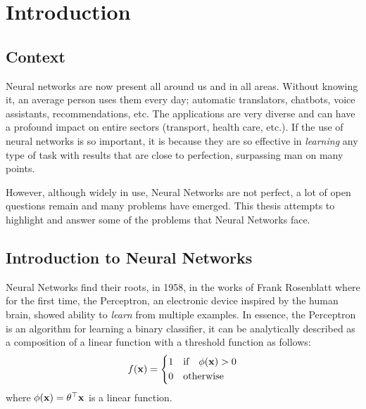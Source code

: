 \chapter{Introduction}
\label{chapter:introduction}
\localtableofcontents

\section{Context}

Neural networks are now present all around us and in all areas.
Without knowing it, an average person uses them every day; automatic translators, chatbots, voice assistants, recommendations, etc.
The applications are very diverse and can have a profound impact on entire sectors (transport, health care, etc.).
If the use of neural networks is so important, it is because they are so effective in \emph{learning} any type of task with results that are close to perfection, surpassing man on many points.

However, although widely in use, Neural Networks are not perfect, a lot of open questions remain and many problems have emerged.
This thesis attempts to highlight and answer some of the problems that Neural Networks face.

\section{Introduction to Neural Networks}

Neural Networks find their roots, in 1958, in the works of Frank Rosenblatt \cite{rosenblatt1958perceptron} where for the first time, the Perceptron, an electronic device inspired by the human brain, showed ability to \emph{learn} from multiple examples.
In essence, the Perceptron is an algorithm for learning a binary classifier, it can be analytically described as a composition of a linear function with a threshold function as follows:
\begin{equation}
  f(\xvec) = \left\{ 
    \begin{aligned}
      &1 \quad \text{if} \quad \phi(\xvec) > 0  \\
      &0 \quad \text{otherwise}
    \end{aligned}
    \right.
\end{equation}
where $\phi(\mathbf{x}) = \theta^\top \mathbf{x}$ is a linear function.

